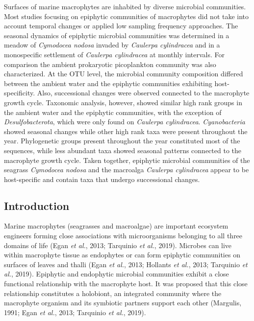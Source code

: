 \documentclass[12pt,]{article}
\begin{document}
Surfaces of marine macrophytes are inhabited by diverse microbial
communities. Most studies focusing on epiphytic communities of
macrophytes did not take into account temporal changes or applied low
sampling frequency approaches. The seasonal dynamics of epiphytic
microbial communities was determined in a meadow of \emph{Cymodocea
nodosa} invaded by \emph{Caulerpa cylindracea} and in a monospecific
settlement of \emph{Caulerpa cylindracea} at monthly intervals. For
comparison the ambient prokaryotic picoplankton community was also
characterized. At the OTU level, the microbial community composition
differed between the ambient water and the epiphytic communities
exhibiting host-specificity. Also, successional changes were observed
connected to the macrophyte growth cycle. Taxonomic analysis, however,
showed similar high rank groups in the ambient water and the epiphytic
communities, with the exception of \emph{Desulfobacterota}, which were
only found on \emph{Caulerpa cylindracea}. \emph{Cyanobacteria} showed
seasonal changes while other high rank taxa were present throughout the
year. Phylogenetic groups present throughout the year constituted most
of the sequences, while less abundant taxa showed seasonal patterns
connected to the macrophyte growth cycle. Taken together, epiphytic
microbial communities of the seagrass \emph{Cymodocea nodosa} and the
macroalga \emph{Caulerpa cylindracea} appear to be host-specific and
contain taxa that undergo successional changes.

\newpage

\hypertarget{introduction}{%
\subsection{Introduction}\label{introduction}}

Marine macrophytes (seagrasses and macroalgae) are important ecosystem
engineers forming close associations with microorganisms belonging to
all three domains of life (Egan \emph{et al.}, 2013; Tarquinio \emph{et
al.}, 2019). Microbes can live within macrophyte tissue as endophytes or
can form epiphytic communities on surfaces of leaves and thalli (Egan
\emph{et al.}, 2013; Hollants \emph{et al.}, 2013; Tarquinio \emph{et
al.}, 2019). Epiphytic and endophytic microbial communities exhibit a
close functional relationship with the macrophyte host. It was proposed
that this close relationship constitutes a holobiont, an integrated
community where the macrophyte organism and its symbiotic partners
support each other (Margulis, 1991; Egan \emph{et al.}, 2013; Tarquinio
\emph{et al.}, 2019).
\end{document}
